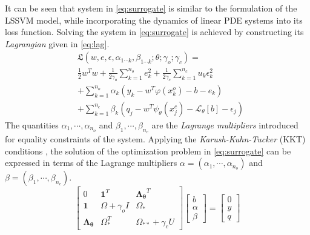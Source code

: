 It can be seen that system in \cref{eq:surrogate} is similar to the formulation of the LSSVM model, 
while incorporating the dynamics of linear PDE systems into its loss function. Solving the system 
in \cref{eq:surrogate} is achieved by constructing its \emph{Lagrangian} given in \cref{eq:lag}.
%
\begin{equation}\label{eq:lag}
  \begin{aligned}
    & \mathfrak{L}(
      w, e,\epsilon, \alpha_{1 \cdots k}, \beta_{1 \cdots k}; \theta; \gamma_{o}; \gamma_{c}
    ) = \\ 
    & \frac{1}{2} w^{T}w + \frac{1}{2\gamma_{o}} \sum_{k = 1}^{n_{o}}{e^{2}_{k}} +
    \frac{1}{2\gamma_{c}} \sum_{k = 1}^{n_{c}}{u_{k} \epsilon^{2}_{k}} \\
    & + \sum_{k = 1}^{n_{o}}{\alpha_{k}(y_{k} - w^{T}\varphi(x^{o}_{k}) - b - e_{k})} \\
    & + \sum_{k = 1}^{n_{c}}{\beta_{k} (q_{j} - w^{T}\psi_{\theta}(x^{c}_{j}) - 
    \mathcal{L}_{\theta}[b] - \epsilon_{j})} 
  \end{aligned}
\end{equation}
%
The quantities $\alpha_{1}, \cdots, \alpha_{n_{o}}$ and $\beta_{1}, \cdots, \beta_{n_{c}}$ are the 
\emph{Lagrange multipliers} introduced for equality constraints of the system. Applying the 
\emph{Karush-Kuhn-Tucker} (KKT) conditions \citep{karush1939minima,kuhn1951nonlinear}, the solution 
of the optimization problem in \cref{eq:surrogate} can be expressed in terms of the Lagrange 
multipliers 
$\alpha = (\alpha_{1}, \cdots, \alpha_{n_{o}})$ and $\beta = (\beta_{1}, \cdots, \beta_{n_{c}})$.
%
\begin{equation}\label{eq:solution}
  \begin{bmatrix}
    0 & \mathbf{1}^{T} & \mathbf{\Lambda_{\theta}}^{T} \\ 
    \mathbf{1} & \Omega + \gamma_{o}I  & \Omega_*\\ 
    \mathbf{\Lambda_{\theta}} & \Omega_{*}^{T}  & \Omega_{**} + \gamma_{c}U 
  \end{bmatrix} \begin{bmatrix}
    b\\ 
    \alpha\\ 
    \beta
  \end{bmatrix} = \begin{bmatrix}
    0\\ 
    y\\ 
    q
  \end{bmatrix}
\end{equation}
